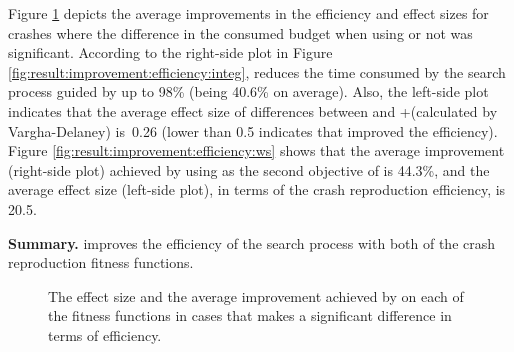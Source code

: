 Figure \ref{fig:result:improvement:efficiency} depicts the average improvements in the efficiency and effect sizes for crashes where the difference in the consumed budget when using \bbc or not was significant.
According to the right-side plot in Figure \ref{fig:result:improvement:efficiency:integ}, \bbc reduces the time consumed by the search process guided by \integ up to 98\% (being 40.6\% on average).
Also, the left-side plot indicates that the average effect size of differences between \integ and \integ+\bbc (calculated by Vargha-Delaney) is~0.26 (lower than 0.5 indicates that \bbc improved the efficiency).
Figure \ref{fig:result:improvement:efficiency:ws} shows that the average improvement (right-side plot) achieved by using \bbc as the second objective of \WS is 44.3\%, and the average effect size (left-side plot), in terms of the crash reproduction efficiency, is 20.5.

\textbf{Summary. } \bbc improves the efficiency of the search process with both of the crash reproduction fitness functions.

\begin{figure}[t]
    \hfil 
    \hfil
    \caption{The effect size and the average improvement achieved by \bbc on each of the fitness functions in cases that \bbc makes a significant difference in terms of efficiency.}
    \label{fig:result:improvement:efficiency}
\end{figure} 



